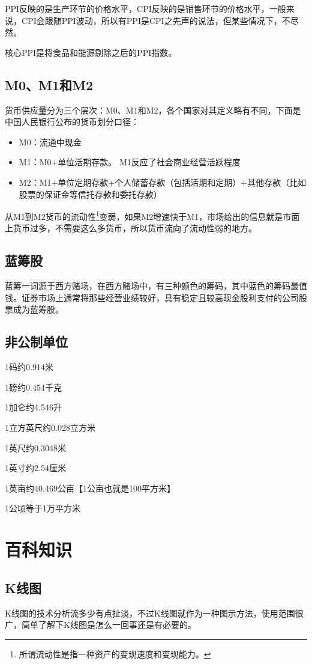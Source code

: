 \documentclass[12pt,oneside]{book}
\begin{document}
PPI反映的是生产环节的价格水平，CPI反映的是销售环节的价格水平，一般来说，CPI会跟随PPI波动，所以有PPI是CPI之先声的说法，但某些情况下，不尽然。

核心PPI是将食品和能源剔除之后的PPI指数。

\section{M0、M1和M2}
货币供应量分为三个层次：M0、M1和M2，各个国家对其定义略有不同，下面是中国人民银行公布的货币划分口径：

\begin{itemize}
\item M0：流通中现金
\item M1：M0+单位活期存款。 M1反应了社会商业经营活跃程度
\item M2：M1+单位定期存款+个人储蓄存款（包括活期和定期）+其他存款（比如股票的保证金等信托存款和委托存款）
\end{itemize}

从M1到M2货币的流动性\footnote{所谓流动性是指一种资产的变现速度和变现能力。}变弱，如果M2增速快于M1，市场给出的信息就是市面上货币过多，不需要这么多货币，所以货币流向了流动性弱的地方。 

\section{蓝筹股}
蓝筹一词源于西方赌场，在西方赌场中，有三种颜色的筹码，其中蓝色的筹码最值钱。证券市场上通常将那些经营业绩较好，具有稳定且较高现金股利支付的公司股票成为蓝筹股。


\section{非公制单位}
1码约0.914米

1磅约0.454千克

1加仑约4.546升

1立方英尺约0.028立方米

1英尺约0.3048米

1英寸约2.54厘米

1英亩约40.469公亩【1公亩也就是100平方米】

1公顷等于1万平方米

\chapter{百科知识}
\section{K线图}
K线图的技术分析流多少有点扯淡，不过K线图就作为一种图示方法，使用范围很广，简单了解下K线图是怎么一回事还是有必要的。
\end{document}
